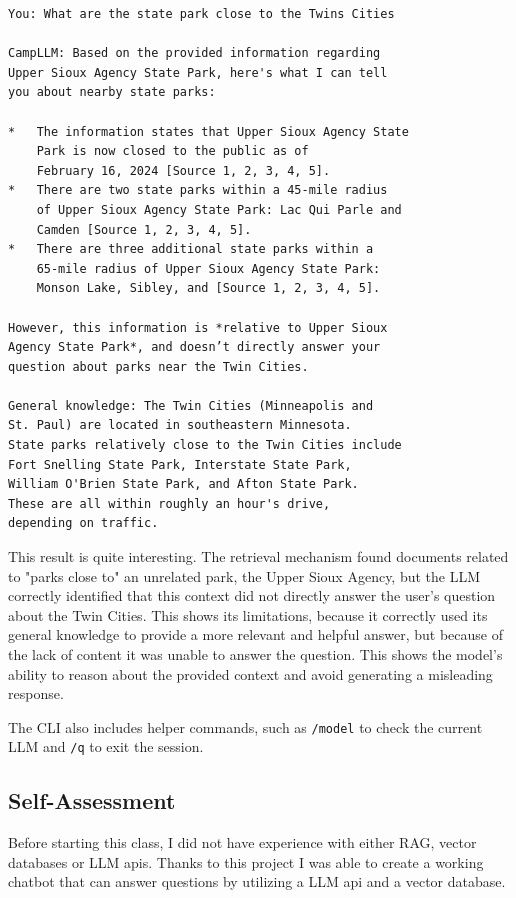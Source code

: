 \documentclass[11pt]{article}
\begin{document}
\begin{lstlisting}[breaklines=true]
You: What are the state park close to the Twins Cities

CampLLM: Based on the provided information regarding 
Upper Sioux Agency State Park, here's what I can tell 
you about nearby state parks:

*   The information states that Upper Sioux Agency State 
    Park is now closed to the public as of 
    February 16, 2024 [Source 1, 2, 3, 4, 5].
*   There are two state parks within a 45-mile radius 
    of Upper Sioux Agency State Park: Lac Qui Parle and 
    Camden [Source 1, 2, 3, 4, 5].
*   There are three additional state parks within a 
    65-mile radius of Upper Sioux Agency State Park: 
    Monson Lake, Sibley, and [Source 1, 2, 3, 4, 5].

However, this information is *relative to Upper Sioux 
Agency State Park*, and doesn’t directly answer your 
question about parks near the Twin Cities. 

General knowledge: The Twin Cities (Minneapolis and 
St. Paul) are located in southeastern Minnesota. 
State parks relatively close to the Twin Cities include 
Fort Snelling State Park, Interstate State Park, 
William O'Brien State Park, and Afton State Park. 
These are all within roughly an hour's drive, 
depending on traffic.
\end{lstlisting}

This result is quite interesting. The retrieval mechanism found documents related to "parks close to" an unrelated park, the Upper Sioux Agency, but the LLM correctly identified that this context did not directly answer the user's question about the Twin Cities. This shows its limitations, because it correctly used its general knowledge to provide a more relevant and helpful answer, but because of the lack of content it was unable to answer the question. This shows the model's ability to reason about the provided context and avoid generating a misleading response.

The CLI also includes helper commands, such as \texttt{/model} to check the current LLM and \texttt{/q} to exit the session.

\subsection{Self-Assessment}
Before starting this class, I did not have experience with either RAG, vector databases or LLM apis. Thanks to this project I was able to create a working chatbot that can answer questions by utilizing a LLM api and a vector database.
\end{document}
